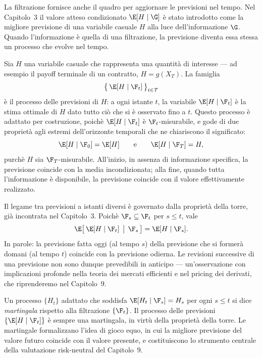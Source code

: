 \noindent
La filtrazione fornisce anche il quadro per aggiornare le previsioni
nel tempo. Nel Capitolo~3 il valore atteso condizionato $\E[H\mid\G]$
\`{e} stato introdotto come la migliore previsione di una variabile
casuale $H$ alla luce dell'informazione $\G$. Quando l'informazione
\`{e} quella di una filtrazione, la previsione diventa essa stessa un
processo che evolve nel tempo.

Sia $H$ una variabile casuale che rappresenta una quantit\`{a} di
interesse --- ad esempio il payoff terminale di un contratto, $H=
g(X_T)$. La famiglia
\[
\bigl\{\,\E[H\mid\F_t]\,\bigr\}_{t\in\mathcal{T}}
\]
\`{e} il processo delle previsioni di $H$: a ogni istante $t$, la
variabile $\E[H\mid\F_t]$ \`{e} la stima ottimale di $H$ dato tutto
ci\`{o} che si \`{e} osservato fino a $t$. Questo processo \`{e}
adattato per costruzione, poich\`{e} $\E[H\mid\F_t]$ \`{e}
$\F_t$-misurabile, e gode di due propriet\`{a} agli estremi
dell'orizzonte temporali che ne chiariscono il significato:
\[
\E[H\mid\F_0]=\E[H]
\qquad\text{e}\qquad
\E[H\mid\F_T]=H,
\]
purch\`{e} $H$ sia $\F_T$-misurabile. All'inizio, in assenza di
informazione specifica, la previsione coincide con la media
incondizionata; alla fine, quando tutta l'informazione \`{e}
disponibile, la previsione coincide con il valore effettivamente
realizzato.

Il legame tra previsioni a istanti diversi \`{e} governato dalla
propriet\`{a} della torre, gi\`{a} incontrata nel Capitolo~3. Poich\`{e}
$\F_s\subseteq\F_t$ per $s\leq t$, vale
\[
\E\bigl[\,\E[H\mid\F_t]\,\bigm|\,\F_s\,\bigr]=\E[H\mid\F_s].
\]
In parole: la previsione fatta oggi (al tempo $s$) della previsione
che si former\`{a} domani (al tempo $t$) coincide con la previsione
odierna. Le revisioni successive di una previsione non sono dunque
prevedibili in anticipo --- un'osservazione con implicazioni
profonde nella teoria dei mercati efficienti e nel pricing dei
derivati, che riprenderemo nel Capitolo~9.

\begin{remark}
Un processo $\{H_t\}$ adattato che soddisfa $\E[H_t\mid\F_s]=H_s$ per
ogni $s\leq t$ si dice \emph{martingala} rispetto alla filtrazione
$\{\F_t\}$. Il processo delle previsioni $\{\E[H\mid\F_t]\}$ \`{e}
sempre una martingala, in virt\`{u} della propriet\`{a} della torre.
Le martingale formalizzano l'idea di gioco equo, in cui la migliore
previsione del valore futuro coincide con il valore presente, e
costituiscono lo strumento centrale della valutazione risk-neutral
del Capitolo~9.
\end{remark}

